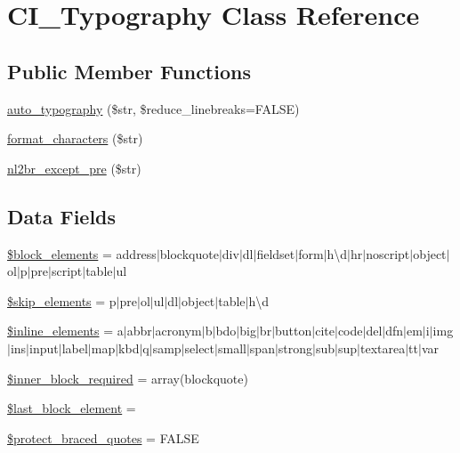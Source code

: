 \hypertarget{class_c_i___typography}{}\section{C\+I\+\_\+\+Typography Class Reference}
\label{class_c_i___typography}
\subsection*{Public Member Functions}
\begin{DoxyCompactItemize}
\item 
\mbox{\hyperlink{class_c_i___typography_a24c284b560f34d6c7fad07e36baaa024}{auto\+\_\+typography}} (\$str, \$reduce\+\_\+linebreaks=F\+A\+L\+SE)
\item 
\mbox{\hyperlink{class_c_i___typography_a45df135c8811c2b27085dbdfd05a1eed}{format\+\_\+characters}} (\$str)
\item 
\mbox{\hyperlink{class_c_i___typography_af9db9732eaa94a62b3a3ccc7f6bf860b}{nl2br\+\_\+except\+\_\+pre}} (\$str)
\end{DoxyCompactItemize}
\subsection*{Data Fields}
\begin{DoxyCompactItemize}
\item 
\mbox{\hyperlink{class_c_i___typography_ac99f5bbe8e02dc1147e9a4205dc161eb}{\$block\+\_\+elements}} = \textquotesingle{}address$\vert$blockquote$\vert$div$\vert$dl$\vert$fieldset$\vert$form$\vert$h\textbackslash{}d$\vert$hr$\vert$noscript$\vert$object$\vert$ol$\vert$p$\vert$pre$\vert$script$\vert$table$\vert$ul\textquotesingle{}
\item 
\mbox{\hyperlink{class_c_i___typography_a80c70a349bff88ad1ef94dea8753bc2e}{\$skip\+\_\+elements}} = \textquotesingle{}p$\vert$pre$\vert$ol$\vert$ul$\vert$dl$\vert$object$\vert$table$\vert$h\textbackslash{}d\textquotesingle{}
\item 
\mbox{\hyperlink{class_c_i___typography_a7ee5f0598125dc7e6b17a08aa6da384f}{\$inline\+\_\+elements}} = \textquotesingle{}a$\vert$abbr$\vert$acronym$\vert$b$\vert$bdo$\vert$big$\vert$br$\vert$button$\vert$cite$\vert$code$\vert$del$\vert$dfn$\vert$em$\vert$i$\vert$img$\vert$ins$\vert$input$\vert$label$\vert$map$\vert$kbd$\vert$q$\vert$samp$\vert$select$\vert$small$\vert$span$\vert$strong$\vert$sub$\vert$sup$\vert$textarea$\vert$tt$\vert$var\textquotesingle{}
\item 
\mbox{\hyperlink{class_c_i___typography_a822eaf22f556c5c52bd766779d9ee22f}{\$inner\+\_\+block\+\_\+required}} = array(\textquotesingle{}blockquote\textquotesingle{})
\item 
\mbox{\hyperlink{class_c_i___typography_a8d5c4b7f2f7b74e118c682cf95688e22}{\$last\+\_\+block\+\_\+element}} = \textquotesingle{}\textquotesingle{}
\item 
\mbox{\hyperlink{class_c_i___typography_a6a74364571da23cc7187c864cde167ca}{\$protect\+\_\+braced\+\_\+quotes}} = F\+A\+L\+SE
\end{DoxyCompactItemize}

